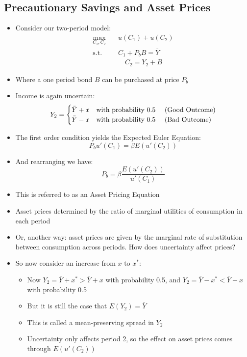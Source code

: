 \documentclass[a4paper,twoside]{article}
\numberwithin{equation}{section}
\numberwithin{figure}{section}
\begin{document}
\subsection{Precautionary Savings and Asset Prices}
	\begin{itemize}
		\item Consider our two-period model:
		\begin{align*}
			\max_{C_1,C_2}\quad &u(C_1) + u(C_2) \\
			\text{s.t.}\quad &C_1 + P_b B = \bar{Y} \\
			&\quad C_2 = Y_2 + B
		\end{align*}
		\item Where a one period bond \( B \) can be purchased at price \( P_b \)
		\item Income is again uncertain:
		\[
			Y_2 =
			\begin{cases}
				\bar{Y} + x & \text{with probability 0.5 \quad (Good Outcome)} \\
				\bar{Y} - x & \text{with probability 0.5 \quad (Bad Outcome)}
			\end{cases}
		\]
		\item The first order condition yields the Expected Euler Equation:
		\[
			P_b u'(C_1) = \beta E (u'(C_2))
		\]
		\item And rearranging we have:
		\[
			P_b = \beta \frac{E(u'(C_2))}{u'(C_1)}
		\]
		\item This is referred to as an \textcolor{myblue}{Asset Pricing Equation}
		\item Asset prices determined by the ratio of marginal utilities of consumption in each period
		\item Or, another way: asset prices are given by the marginal rate of substitution between consumption across periods. \textcolor{myblue}{How does uncertainty affect prices?}
		\item So now consider an increase from \( x \) to \( x^* \):
		\begin{itemize}
			\item Now \( Y_2 = \bar{Y} + x^* > \bar{Y} + x \) with probability 0.5, and \( Y_2 = \bar{Y} - x^* < \bar{Y} - x \) with probability 0.5
			\item But it is still the case that \( E(Y_2) = \bar{Y} \)
			\item This is called a \textcolor{myblue}{mean-preserving spread} in \( Y_2 \)
			\item Uncertainty only affects period 2, so the effect on asset prices comes through  \( E(u'(C_2)) \)
		\end{itemize}
	\end{itemize}
\end{document}
